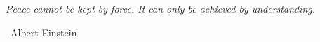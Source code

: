 \documentclass{exam}
\begin{document}
\else

\vspace{10 cm}




{\em Peace cannot be kept by force.  It can only be achieved by understanding.}

\vspace{.2 cm}

\hspace{1 cm} --Albert Einstein

\fi
\end{document}
